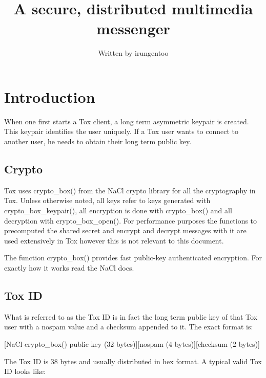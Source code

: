 \documentclass{tox}
\begin{document}
\title{A secure, distributed multimedia messenger}


\author{Written by irungentoo} %

\maketitle

\section{Introduction}

When one first starts a Tox client, a long term asymmetric keypair is created. 
This keypair identifies the user uniquely. If a Tox user wants to connect to 
another user, he needs to obtain their long term public key. 

\subsection{Crypto}

Tox uses crypto\_box() from the NaCl crypto library for all the cryptography in 
Tox. Unless otherwise noted, all keys refer to keys generated with 
crypto\_box\_keypair(), all encryption is done with crypto\_box() and all 
decryption with crypto\_box\_open(). For performance purposes the functions to 
precomputed the shared secret and encrypt and decrypt messages with it are used 
extensively in Tox however this is not relevant to this document.

The function crypto\_box() provides fast public-key authenticated encryption. 
For exactly how it works read the NaCl docs.

\subsection{Tox ID}

What is referred to as the Tox ID is in fact the long term public key of that 
Tox user with a nospam value and a checksum appended to it. The exact format is:

[NaCl crypto\_box() public key (32 bytes)][nospam (4 bytes)][checksum (2 bytes)]

The Tox ID is 38 bytes and usually distributed in hex format. A typical valid 
Tox ID looks like:
\end{document}
